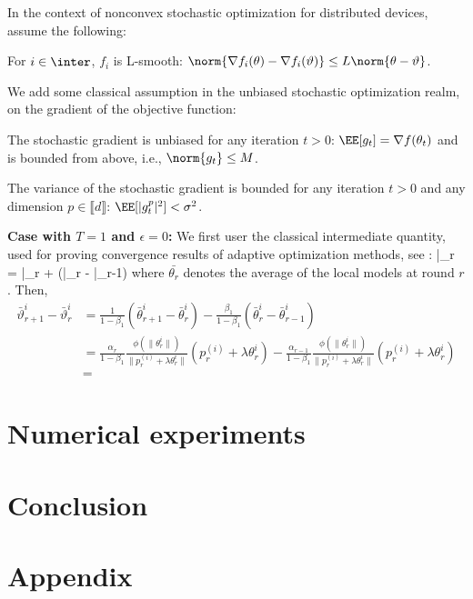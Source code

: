 \documentclass{article}
\begin{document}
In the context of nonconvex stochastic optimization for distributed devices, assume the following:

\begin{assumption}
For $i \in \inter$, $f_i$ is  L-smooth: $\norm{\nabla f_i (\theta) - \nabla f_i (\vartheta)} \leq L \norm{\theta-\vartheta}$.
\end{assumption}
We add some classical assumption in the unbiased stochastic optimization realm, on the gradient of the objective function:
\begin{assumption}
The stochastic gradient is unbiased for any iteration $t>0$: $\EE[g_t] = \nabla f(\theta_t)$ and is bounded from above, i.e., $\norm{g_t} \leq M$.
\end{assumption}

\begin{assumption}
The variance of the stochastic gradient is bounded for any iteration $t>0$ and any dimension $p \in \llbracket d \rrbracket$: $\EE[|g_t^p|^2] < \sigma^2$.
\end{assumption}


\textbf{Case with $T=1$ and $\epsilon = 0$:}
We first user the classical intermediate quantity, used for proving convergence results of adaptive optimization methods, see \citep{}:
\beq
\bar{\vartheta}_r = \bar{\theta}_r +  (\bar{\theta}_{r} - \bar{\theta}_{r-1})
\eeq
where $\bar{\theta_r}$ denotes the average of the local models at round $r$.
Then,
\begin{align}
\bar{\vartheta}^i_{r+1} - \bar{\vartheta}^i_r  & = \frac{1}{1-\beta_1}(\bar{\theta}^i_{r+1} - \bar{\theta}^i_{r}) - \frac{\beta_1}{1-\beta_1}(\bar{\theta}^i_{r} - \bar{\theta}^i_{r-1})\\
& = \frac{\alpha_{r}}{1-\beta_1} \frac{\phi(\|\theta_{r}^{i}\|)}{\|p_{r}^{(i)}+\lambda \theta_{r}^{i}\|} (p_{r}^{(i)}+\lambda \theta_{r}^{i})  - \frac{\alpha_{r-1}}{1-\beta_1} \frac{\phi(\|\theta_{r}^{i}\|)}{\|p_{r}^{(i)}+\lambda \theta_{r}^{i}\|} (p_{r}^{(i)}+\lambda \theta_{r}^{i}) \\
& = 
\end{align}


\section{Numerical experiments}\label{sec:numerical}


\section{Conclusion}\label{sec:conclusion}

\newpage





\appendix 

\section{Appendix}\label{sec:appendix}


\end{document}
